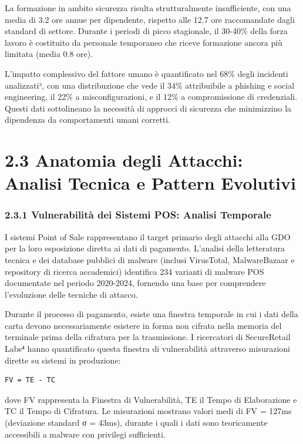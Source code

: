 \documentclass[12pt,a4paper,oneside]{book}
\begin{document}
La formazione in ambito sicurezza risulta strutturalmente insufficiente,
con una media di 3.2 ore annue per dipendente, rispetto alle 12.7 ore
raccomandate dagli standard di settore. Durante i periodi di picco
stagionale, il 30-40\% della forza lavoro è costituito da personale
temporaneo che riceve formazione ancora più limitata (media 0.8 ore).

L'impatto complessivo del fattore umano è quantificato nel 68\% degli
incidenti analizzati³, con una distribuzione che vede il 34\%
attribuibile a phishing e social engineering, il 22\% a
misconfigurazioni, e il 12\% a compromissione di credenziali. Questi
dati sottolineano la necessità di approcci di sicurezza che minimizzino
la dipendenza da comportamenti umani corretti.

\section{2.3 Anatomia degli Attacchi: Analisi Tecnica e Pattern
Evolutivi}\label{anatomia-degli-attacchi-analisi-tecnica-e-pattern-evolutivi}

\subsubsection{2.3.1 Vulnerabilità dei Sistemi POS: Analisi
Temporale}\label{vulnerabilituxe0-dei-sistemi-pos-analisi-temporale}

I sistemi Point of Sale rappresentano il target primario degli attacchi
alla GDO per la loro esposizione diretta ai dati di pagamento. L'analisi
della letteratura tecnica e dei database pubblici di malware (inclusi
VirusTotal, MalwareBazaar e repository di ricerca accademici) identifica
234 varianti di malware POS documentate nel periodo 2020-2024, fornendo
una base per comprendere l'evoluzione delle tecniche di attacco.

Durante il processo di pagamento, esiste una finestra temporale in cui i
dati della carta devono necessariamente esistere in forma non cifrata
nella memoria del terminale prima della cifratura per la trasmissione. I
ricercatori di SecureRetail Labs⁴ hanno quantificato questa finestra di
vulnerabilità attraverso misurazioni dirette su sistemi in produzione:

\begin{verbatim}
FV = TE - TC
\end{verbatim}

dove FV rappresenta la Finestra di Vulnerabilità, TE il Tempo di
Elaborazione e TC il Tempo di Cifratura. Le misurazioni mostrano valori
medi di FV = 127ms (deviazione standard σ = 43ms), durante i quali i
dati sono teoricamente accessibili a malware con privilegi sufficienti.
\end{document}
